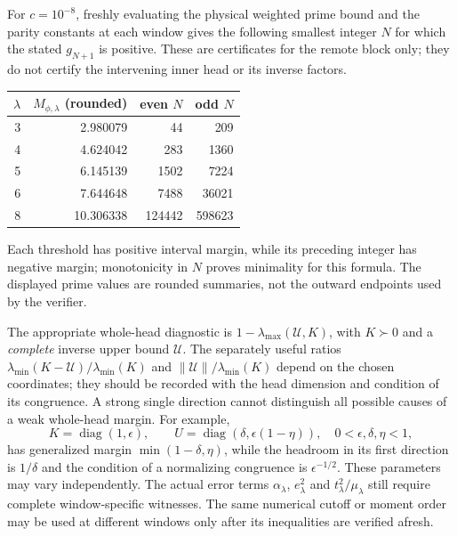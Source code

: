 For $c=10^{-8}$, freshly evaluating the physical weighted prime bound
and the parity constants at each window gives the following smallest
integer $N$ for which the stated $g_{N+1}$ is positive.  These are
certificates for the remote block only; they do not certify the
intervening inner head or its inverse factors.
\begin{center}
\begin{tabular}{rrrr}
\toprule
$\lambda$ & $M_{\phi,\lambda}$ (rounded) & even $N$ & odd $N$\\
\midrule
3&2.980079&44&209\\
4&4.624042&283&1360\\
5&6.145139&1502&7224\\
6&7.644648&7488&36021\\
8&10.306338&124442&598623\\
\bottomrule
\end{tabular}
\end{center}
Each threshold has positive interval margin, while its preceding
integer has negative margin; monotonicity in $N$ proves minimality
for this formula.  The displayed prime values are rounded summaries,
not the outward endpoints used by the verifier.

The appropriate whole-head diagnostic is
$1-\lambda_{\max}(\mathcal U,K)$, with $K\succ0$ and a
\emph{complete} inverse upper bound $\mathcal U$.  The separately
useful ratios $\lambda_{\min}(K-\mathcal U)/\lambda_{\min}(K)$ and
$\|\mathcal U\|/\lambda_{\min}(K)$ depend on the chosen coordinates;
they should be recorded with the head dimension and condition of
its congruence.  A strong single direction cannot distinguish all
possible causes of a weak whole-head margin.  For example,
\[
 K=\operatorname{diag}(1,\epsilon),\qquad
 U=\operatorname{diag}(\delta,\epsilon(1-\eta)),
 \quad 0<\epsilon,\delta,\eta<1,
\]
has generalized margin $\min(1-\delta,\eta)$, while the headroom
in its first direction is $1/\delta$ and the condition of a
normalizing congruence is $\epsilon^{-1/2}$.  These parameters
may vary independently.  The actual error terms
$\alpha_\lambda$, $e_\lambda^2$ and $t_\lambda^2/\mu_\lambda$
still require complete window-specific witnesses.  The same
numerical cutoff or moment order may be used at different windows
only after its inequalities are verified afresh.

